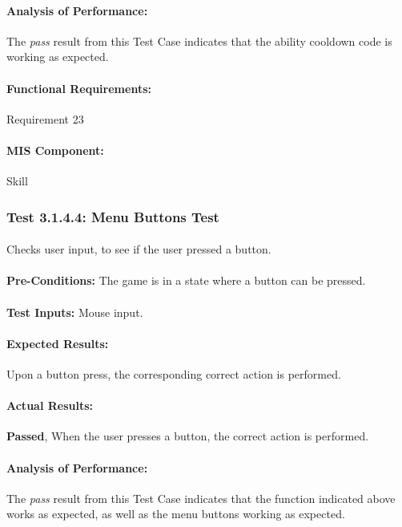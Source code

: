 \documentclass{article}
\begin{document}
    \paragraph{Analysis of Performance:}The \emph{pass} result from this Test Case indicates that the ability cooldown code is working as expected.
    \paragraph{Functional Requirements:} Requirement 23
    \paragraph{MIS Component:} Skill
    
    \subsubsection{Test 3.1.4.4: Menu Buttons Test}
    \paragraph{}\textbf{}
    \paragraph{}Checks user input, to see if the user pressed a button. 
    \paragraph{}\textbf{Pre-Conditions:} The game is in a state where a button can be pressed. 
    \paragraph{}\textbf{Test Inputs:} Mouse input.
    \paragraph{Expected Results:} Upon a button press, the corresponding correct action is performed.
    \paragraph{Actual Results:} \textbf{Passed}, When the user presses a button, the correct action is performed.
    \paragraph{Analysis of Performance:} The \emph{pass} result from this Test Case indicates that the function indicated above works as expected, as well as the menu buttons working as expected.
\end{document}
